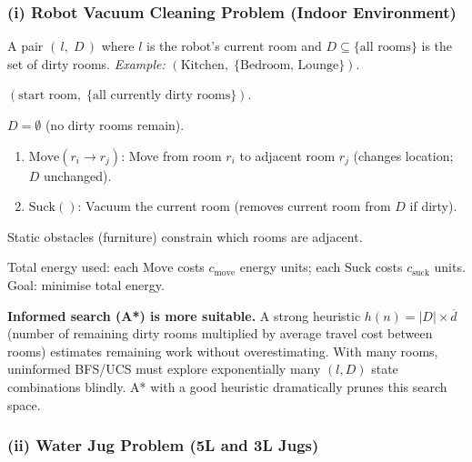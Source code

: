 \documentclass[12pt, a4paper]{article}
\begin{document}
\subsubsection*{(i) Robot Vacuum Cleaning Problem (Indoor Environment)}

\begin{description}[leftmargin=3.2cm, labelwidth=3cm, labelsep=0.2cm]
  \item[\textbf{State:}]
    A pair $(\,l,\; D\,)$ where $l$ is the robot's current room and $D \subseteq \{\text{all rooms}\}$ is the set of dirty rooms.
    \emph{Example:} $(\text{Kitchen},\; \{\text{Bedroom, Lounge}\})$.

  \item[\textbf{Initial state:}]
    $(\text{start room},\; \{\text{all currently dirty rooms}\})$.

  \item[\textbf{Goal test:}]
    $D = \emptyset$ \quad (no dirty rooms remain).

  \item[\textbf{Operators:}]
    \begin{enumerate}[noitemsep]
      \item $\mathrm{Move}(r_i \to r_j)$: Move from room $r_i$ to adjacent room $r_j$ (changes location; $D$ unchanged).
      \item $\mathrm{Suck}()$: Vacuum the current room (removes current room from $D$ if dirty).
    \end{enumerate}
    Static obstacles (furniture) constrain which rooms are adjacent.

  \item[\textbf{Path cost:}]
    Total energy used: each $\mathrm{Move}$ costs $c_{\mathrm{move}}$ energy units; each $\mathrm{Suck}$ costs $c_{\mathrm{suck}}$ units. Goal: minimise total energy.

  \item[\textbf{Informed vs.\ Uninformed:}]
    \textbf{Informed search (A*) is more suitable.} A strong heuristic $h(n) = |D| \times \overline{d}$ (number of remaining dirty rooms multiplied by average travel cost between rooms) estimates remaining work without overestimating. With many rooms, uninformed BFS/UCS must explore exponentially many $(l, D)$ state combinations blindly. A* with a good heuristic dramatically prunes this search space.
\end{description}

\subsubsection*{(ii) Water Jug Problem (5L and 3L Jugs)}
\end{document}
